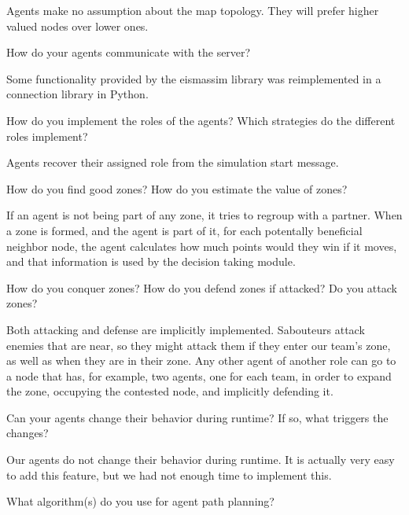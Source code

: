 Agents make no assumption about the map topology. They will
prefer higher valued nodes over lower ones.


\begin{question}
How do your agents communicate with the server?  
\end{question}

Some functionality
provided by the eismassim library was reimplemented in a connection library in
Python.

\begin{question}
How do you implement the roles of the agents? Which strategies do the
different roles implement?  
\end{question}

Agents recover their assigned role from the
simulation start message.  

\begin{question}
How do you find good zones? How do you estimate the value of zones?  
\end{question}

If an
agent is not being part of any zone, it tries to regroup with a partner.  When
a zone is formed, and the agent is part of it, for each potentally beneficial
neighbor node, the agent calculates how much points would they win if it
moves, and that information is used by the decision taking module.

\begin{question}
How do you conquer zones? How do you defend zones if attacked? Do you
attack zones?  
\end{question}

Both attacking and defense are implicitly implemented.
Sabouteurs attack enemies that are near, so they might attack them if they
enter our team's zone, as well as when they are in their zone. Any other agent
of another role can go to a node that has, for example, two agents, one for
each team, in order to expand the zone, occupying the contested node, and
implicitly defending it.

\begin{question}
Can your agents change their behavior during runtime? If so, what triggers
the changes?  
\end{question}

Our agents do not change their behavior during runtime. It is
actually very easy to add this feature, but we had not enough time to
implement this.

\begin{question}
What algorithm(s) do you use for agent path planning?  
\end{question}

